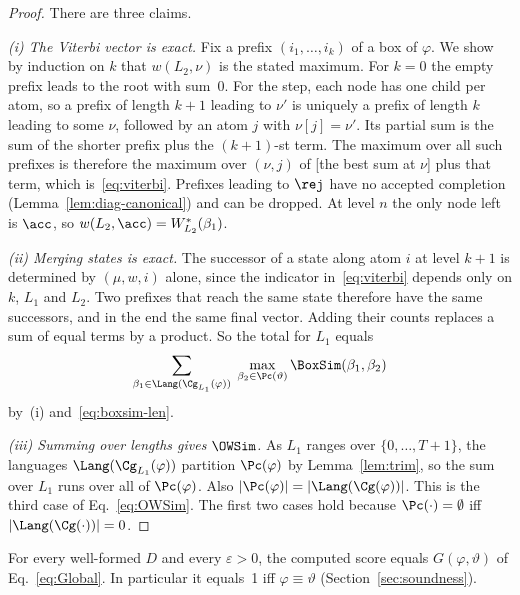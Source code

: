 \begin{proof}
There are three claims.

\emph{(i) The Viterbi vector is exact.} Fix a prefix $(i_1,\dots,i_k)$ of a box
of $\varphi$. We show by induction on $k$ that $w(L_2,\nu)$ is the stated
maximum. For $k=0$ the empty prefix leads to the root with sum~$0$. For the
step, each node has one child per atom, so a prefix of length $k+1$ leading to
$\nu'$ is uniquely a prefix of length $k$ leading to some $\nu$, followed by an
atom $j$ with $\nu[j]=\nu'$. Its partial sum is the sum of the shorter prefix
plus the $(k+1)$-st term. The maximum over all such prefixes is therefore the
maximum over $(\nu,j)$ of [the best sum at $\nu$] plus that term, which
is~\eqref{eq:viterbi}. Prefixes leading to $\rej$ have no accepted completion
(Lemma~\ref{lem:diag-canonical}) and can be dropped. At level $n$ the only
node left is $\acc$, so $w(L_2,\acc)=W^*_{L_2}(\beta_1)$.

\emph{(ii) Merging states is exact.} The successor of a state along atom $i$ at
level $k+1$ is determined by $(\mu,w,i)$ alone, since the indicator
in~\eqref{eq:viterbi} depends only on $k$, $L_1$ and $L_2$. Two prefixes that
reach the same state therefore have the same successors, and in the end the
same final vector. Adding their counts replaces a sum of equal terms by a
product. So the total for $L_1$ equals
\[
  \sum_{\beta_1\in\Lang(\Cg_{L_1}(\varphi))}\;\max_{\beta_2\in\Pc(\vartheta)}\BoxSim(\beta_1,\beta_2)
\]
by~(i) and~\eqref{eq:boxsim-len}.

\emph{(iii) Summing over lengths gives $\OWSim$.} As $L_1$ ranges over
$\{0,\dots,T+1\}$, the languages $\Lang(\Cg_{L_1}(\varphi))$ partition
$\Pc(\varphi)$ by Lemma~\ref{lem:trim}, so the sum over $L_1$ runs over all of $\Pc(\varphi)$.
Also $|\Pc(\varphi)|=|\Lang(\Cg(\varphi))|$. This is the third case of
Eq.~\eqref{eq:OWSim}. The first two cases hold because
$\Pc(\cdot)=\emptyset$ iff $|\Lang(\Cg(\cdot))|=0$.
\end{proof}

\begin{corollary}\label{cor:compat}
For every well-formed $D$ and every $\varepsilon>0$, the computed score equals
$G(\varphi,\vartheta)$ of Eq.~\eqref{eq:Global}. In particular it equals~1 iff
$\varphi\equiv\vartheta$ (Section~\ref{sec:soundness}).
\end{corollary}

